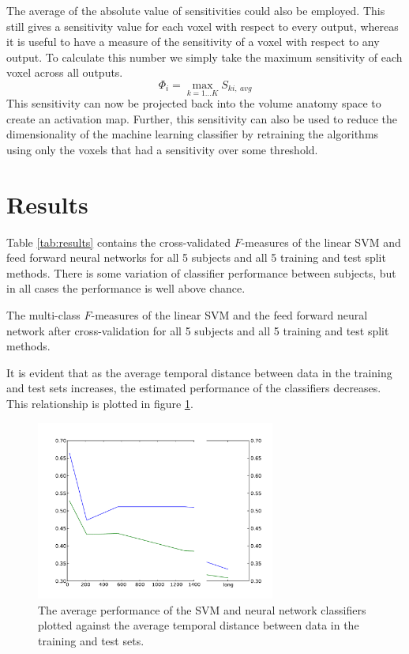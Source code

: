 \documentclass[preprint,authoryear,12pt]{elsarticle}
\begin{document}
The average of the absolute value of sensitivities could also be employed.
This still gives a sensitivity value for each voxel with respect to every output, whereas it is useful to have a measure of the sensitivity of a voxel with respect to any output.
To calculate this number we simply take the maximum sensitivity of each voxel across all outputs.
\begin{equation}
\Phi_{i} = \max_{k=1 \dots K}{S_{ki,~avg}}
\end{equation}
This sensitivity can now be projected back into the volume anatomy space to create an activation map.
Further, this sensitivity can also be used to reduce the dimensionality of the machine learning classifier by retraining the algorithms using only the voxels that had a sensitivity over some threshold.

\section{Results}
Table \ref{tab:results} contains the cross-validated $F$-measures of the linear SVM and feed forward neural networks for all 5 subjects and all 5 training and test split methods.
There is some variation of classifier performance between subjects, but in all cases the performance is well above chance. 

\begin{table}
\centering

\caption{The multi-class $F$-measures of the linear SVM and the feed forward neural network after cross-validation for all 5 subjects and all 5 training and test split methods. }
\label{tab:results}
\end{table}

It is evident that as the average temporal distance between data in the training and test sets increases, the estimated performance of the classifiers decreases.
This relationship is plotted in figure \ref{fig:performance-verse-temporal-distance}.

\begin{figure}
\centering
\includegraphics[width=0.7\textwidth]{figures/performance-verse-temporal-distance}
\caption{The average performance of the SVM and neural network classifiers plotted against the average temporal distance between data in the training and test sets.}
\label{fig:performance-verse-temporal-distance}
\end{figure}
\end{document}
